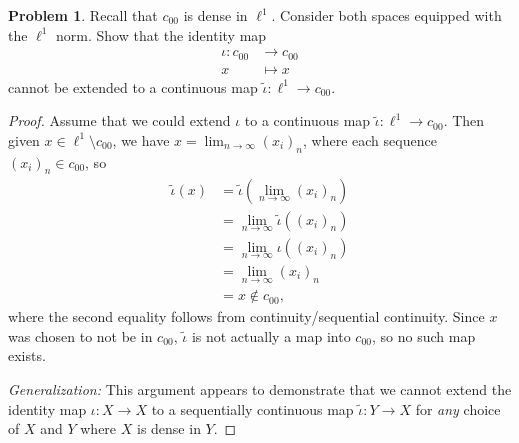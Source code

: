 \documentclass[12pt]{article}
\theoremstyle{definition}
\newtheorem{ex}{Problem}
\begin{document}
\begin{ex}
	Recall that $c_{00}$ is dense in $\ell^1$.
	Consider both spaces equipped with the $\ell^1$ norm.
	Show that the identity map \begin{align*}
		\iota : c_{00} & \to c_{00} \\
		x              & \mapsto x
	\end{align*}
	cannot be extended to a continuous map $\widetilde{\iota} : \ell^1 \to c_{00}$.
\end{ex}
\begin{proof}
	Assume that we could extend $\iota$ to a continuous map $\widetilde{\iota}: \ell^1 \to c_{00}$.
	Then given $x \in \ell^1 \setminus c_{00}$, we have $x = \lim_{n\to\infty} (x_i)_n$, where each sequence $(x_i)_n \in c_{00}$, so \begin{align*}
		\widetilde{\iota}(x) & = \widetilde{\iota}\left( \lim_{n\to\infty} (x_i)_n \right) \\
		                     & = \lim_{n\to\infty} \widetilde{\iota}\left( (x_i)_n \right) \\
		                     & = \lim_{n\to\infty} \iota\left( (x_i)_n \right)             \\
		                     & = \lim_{n\to\infty} (x_i)_n                                 \\
		                     & = x \notin c_{00},
	\end{align*}
	where the second equality follows from continuity/sequential continuity.
	Since $x$ was chosen to not be in $c_{00}$, $\widetilde{\iota}$ is not actually a map into $c_{00}$, so no such map exists.

	\textit{Generalization:} This argument appears to demonstrate that we cannot extend the identity map $\iota : X \to X$ to a sequentially continuous map $\widetilde{\iota} : Y \to X$ for \textit{any} choice of $X$ and $Y$ where $X$ is dense in $Y$.
\end{proof}
\end{document}
